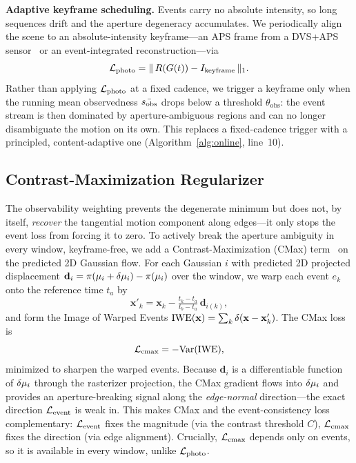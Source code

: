 \medskip\noindent\textbf{Adaptive keyframe scheduling.} Events carry no absolute intensity, so long sequences drift and the aperture degeneracy accumulates. We periodically align the scene to an absolute-intensity keyframe---an APS frame from a DVS+APS sensor~\cite{gallego2020event} or an event-integrated reconstruction---via
\begin{equation}
  \mathcal{L}_{\text{photo}} = \|\,R(G(t)) - I_{\text{keyframe}}\,\|_1.
  \label{eq:photo-loss}
\end{equation}
Rather than applying $\mathcal{L}_{\text{photo}}$ at a fixed cadence, we trigger a keyframe only when the running mean observedness $\bar{s_{\mathrm{obs}}}$ drops below a threshold $\theta_{\text{obs}}$: the event stream is then dominated by aperture-ambiguous regions and can no longer disambiguate the motion on its own. This replaces a fixed-cadence trigger with a principled, content-adaptive one (Algorithm~\ref{alg:online}, line~10).

\subsection{Contrast-Maximization Regularizer}
\label{sec:cmax}
The observability weighting prevents the degenerate minimum but does not, by itself, \emph{recover} the tangential motion component along edges---it only stops the event loss from forcing it to zero. To actively break the aperture ambiguity in every window, keyframe-free, we add a Contrast-Maximization (CMax) term~\cite{gallego2018contrast} on the predicted 2D Gaussian flow. For each Gaussian $i$ with predicted 2D projected displacement $\mathbf{d}_i = \pi(\mu_i+\delta\mu_i) - \pi(\mu_i)$ over the window, we warp each event $e_k$ onto the reference time $t_a$ by
\begin{equation}
  \mathbf{x}'_k = \mathbf{x}_k - \tfrac{t_k - t_a}{t_b - t_a}\,\mathbf{d}_{i(k)},
  \label{eq:event-warp}
\end{equation}
and form the Image of Warped Events $\mathrm{IWE}(\mathbf{x}) = \sum_k \delta(\mathbf{x}-\mathbf{x}'_k)$. The CMax loss is
\begin{equation}
  \mathcal{L}_{\text{cmax}} = -\mathrm{Var}(\mathrm{IWE}),
  \label{eq:cmax-loss}
\end{equation}
minimized to sharpen the warped events. Because $\mathbf{d}_i$ is a differentiable function of $\delta\mu_i$ through the rasterizer projection, the CMax gradient flows into $\delta\mu_i$ and provides an aperture-breaking signal along the \emph{edge-normal} direction---the exact direction $\mathcal{L}_{\text{event}}$ is weak in. This makes CMax and the event-consistency loss complementary: $\mathcal{L}_{\text{event}}$ fixes the magnitude (via the contrast threshold $C$), $\mathcal{L}_{\text{cmax}}$ fixes the direction (via edge alignment). Crucially, $\mathcal{L}_{\text{cmax}}$ depends only on events, so it is available in every window, unlike $\mathcal{L}_{\text{photo}}$.

